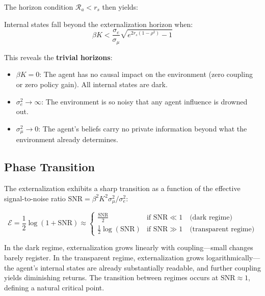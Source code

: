 \documentclass[runningheads]{llncs}
\begin{document}
The horizon condition $\mathcal{R}_a < r_s$ then yields:

\begin{corollary}
Internal states fall beyond the externalization horizon when:
\begin{equation}
    \beta K < \frac{\sigma_e}{\sigma_\mu} \sqrt{e^{2 r_s (1-\rho^2)} - 1}
    \label{eq:horizon_bk}
\end{equation}
\end{corollary}

This reveals the \textbf{trivial horizons}:
\begin{itemize}
    \item $\beta K = 0$: The agent has no causal impact on the environment (zero coupling or zero policy gain). All internal states are dark.
    \item $\sigma_e^2 \to \infty$: The environment is so noisy that any agent influence is drowned out.
    \item $\sigma_\mu^2 \to 0$: The agent's beliefs carry no private information beyond what the environment already determines.
\end{itemize}

\subsection{Phase Transition}

The externalization exhibits a sharp transition as a function of the effective signal-to-noise ratio $\text{SNR} = \beta^2 K^2 \sigma_\mu^2 / \sigma_e^2$:

\begin{equation}
    \mathcal{E} = \frac{1}{2} \log(1 + \text{SNR}) \approx
    \begin{cases}
        \frac{\text{SNR}}{2} & \text{if } \text{SNR} \ll 1 \quad \text{(dark regime)} \\
        \frac{1}{2} \log(\text{SNR}) & \text{if } \text{SNR} \gg 1 \quad \text{(transparent regime)}
    \end{cases}
    \label{eq:phase_transition}
\end{equation}

In the dark regime, externalization grows linearly with coupling---small changes barely register. In the transparent regime, externalization grows logarithmically---the agent's internal states are already substantially readable, and further coupling yields diminishing returns. The transition between regimes occurs at $\text{SNR} \approx 1$, defining a natural critical point.
\end{document}
